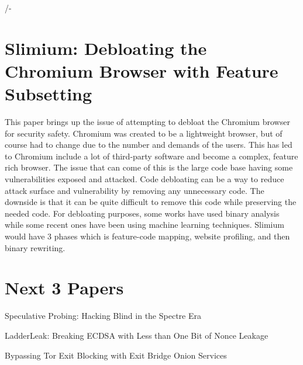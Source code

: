 /-\documentclass{article}
\begin{document}
\section{Slimium: Debloating the Chromium Browser with Feature Subsetting\cite{QI20}}

This paper brings up the issue of attempting to debloat the Chromium browser for security safety. Chromium was created to be a lightweight browser, but of course had to change due to the number and demands of the users. This has led to Chromium include a lot of third-party software and become a complex, feature rich browser. The issue that can come of this is the large code base having some vulnerabilities exposed and attacked. Code debloating can be a way to reduce attack surface and vulnerability by removing any unnecessary code. The downside is that it can be quite difficult to remove this code while preserving the needed code. For debloating purposes, some works have used binary analysis while some recent ones have been using machine learning techniques. Slimium would have 3 phases which is feature-code mapping, website profiling, and then binary rewriting.

\section{Next 3 Papers}
\item Speculative Probing: Hacking Blind in the Spectre Era
\item LadderLeak: Breaking ECDSA with Less than One Bit of Nonce Leakage
\item Bypassing Tor Exit Blocking with Exit Bridge Onion Services
\printbibliography
\end{document}
